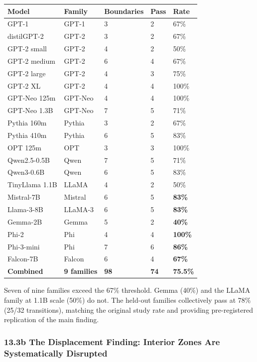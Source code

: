 \documentclass[12pt]{article}
\begin{document}
\begin{longtable}[]{@{}lllll@{}}
\toprule\noalign{}
Model & Family & Boundaries & Pass & Rate \\
\midrule\noalign{}
\endhead
\bottomrule\noalign{}
\endlastfoot
GPT-1 & GPT-1 & 3 & 2 & 67\% \\
distilGPT-2 & GPT-2 & 3 & 2 & 67\% \\
GPT-2 small & GPT-2 & 4 & 2 & 50\% \\
GPT-2 medium & GPT-2 & 6 & 4 & 67\% \\
GPT-2 large & GPT-2 & 4 & 3 & 75\% \\
GPT-2 XL & GPT-2 & 4 & 4 & 100\% \\
GPT-Neo 125m & GPT-Neo & 4 & 4 & 100\% \\
GPT-Neo 1.3B & GPT-Neo & 7 & 5 & 71\% \\
Pythia 160m & Pythia & 3 & 2 & 67\% \\
Pythia 410m & Pythia & 6 & 5 & 83\% \\
OPT 125m & OPT & 3 & 3 & 100\% \\
Qwen2.5-0.5B & Qwen & 7 & 5 & 71\% \\
Qwen3-0.6B & Qwen & 6 & 5 & 83\% \\
TinyLlama 1.1B & LLaMA & 4 & 2 & 50\% \\
Mistral-7B & Mistral & 6 & 5 & \textbf{83\%} \\
Llama-3-8B & LLaMA-3 & 6 & 5 & \textbf{83\%} \\
Gemma-2B & Gemma & 5 & 2 & \textbf{40\%} \\
Phi-2 & Phi & 4 & 4 & \textbf{100\%} \\
Phi-3-mini & Phi & 7 & 6 & \textbf{86\%} \\
Falcon-7B & Falcon & 6 & 4 & \textbf{67\%} \\
\textbf{Combined} & \textbf{9 families} & \textbf{98} & \textbf{74} &
\textbf{75.5\%} \\
\end{longtable}

Seven of nine families exceed the 67\% threshold. Gemma (40\%) and the
LLaMA family at 1.1B scale (50\%) do not. The held-out families
collectively pass at 78\% (25/32 transitions), matching the original
study rate and providing pre-registered replication of the main finding.

\subsubsection{13.3b The Displacement Finding: Interior Zones Are
Systematically
Disrupted}\label{b-the-displacement-finding-interior-zones-are-systematically-disrupted}
\end{document}
